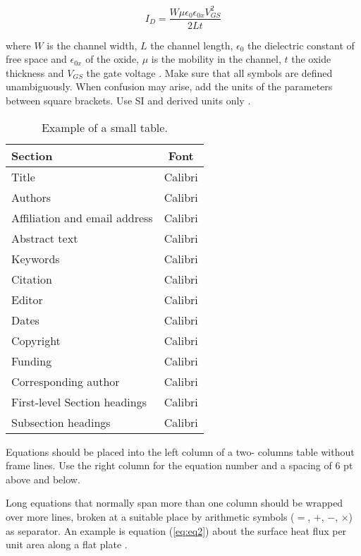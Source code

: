 \documentclass[final]{imeko_acta}
\begin{document}
\begin{equation}\label{eq:eq1}
	I_D = \frac{W \mu \epsilon_0 \epsilon_{0x} V^2_{GS}}{2Lt}
\end{equation}

where $W$ is the channel width, $L$ the channel length, $\epsilon_0$ the dielectric constant of free space and $\epsilon_{0x}$ of the oxide, $\mu$ is the mobility in the channel, $t$ the oxide thickness and $V_{GS}$ the gate voltage \cite{Middelhoek1989}. Make sure that all symbols are defined unambiguously. When confusion may arise, add the units of the parameters between square brackets. Use SI and derived units only \cite{Grattan1994}. 

\begin{table}[!b]
	\caption{Example of a small table.}
	\label{tab:tab2}
	\centering
	\begin{tabularx}{\columnwidth}{lC}
		\toprule
		Section & Font \\
		\midrule
		Title & Calibri \\
		Authors & Calibri \\
		Affiliation and email address & Calibri \\
		Abstract text & Calibri \\
		Keywords & Calibri \\
		Citation & Calibri \\
		Editor & Calibri \\
		Dates & Calibri \\
		Copyright & Calibri \\
		Funding & Calibri \\
		Corresponding author & Calibri \\
		First-level Section headings  & Calibri \\
		Subsection headings & Calibri \\
		\bottomrule
	\end{tabularx}
\end{table}

Equations should be placed into the left column of a two-
columns table without frame lines. Use the right column for the
equation number and a spacing of 6 pt above and below.

Long equations that normally span more than one column should be wrapped over more lines, broken at a suitable place by arithmetic symbols ($=$, $+$, $-$, $\times$) as separator. An example is equation  (\ref{eq:eq2}) about the surface heat flux per unit area along a flat plate \cite{Lighthill1950}.
\end{document}
